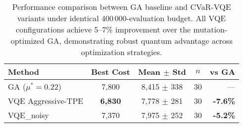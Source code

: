 \begin{table}[htb]
    \centering
    \caption{Performance comparison between GA baseline and CVaR-VQE variants under identical 400\,000-evaluation budget. All VQE configurations achieve 5--7\% improvement over the mutation-optimized GA, demonstrating robust quantum advantage across optimization strategies.}
    \label{tab:main_results}
    \begin{tabular}{lcccr}
        \toprule
        Method & Best Cost & Mean $\pm$ Std & $n$ & vs GA \\
        \midrule
        GA ($\mu^* = 0.22$) & 7,800 & 8,415 $\pm$ 338 & 30 & — \\
        VQE Aggressive-TPE & \textbf{6,830} & 7,778 $\pm$ 281 & 30 & \textbf{-7.6\%} \\
        VQE_noisy & 7,370 & 7,975 $\pm$ 252 & 30 & \textbf{-5.2\%} \\
        \bottomrule
    \end{tabular}
\end{table}